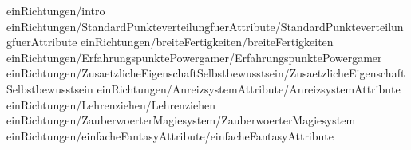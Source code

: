 
 {einRichtungen/intro}
 {einRichtungen/StandardPunkteverteilungfuerAttribute/StandardPunkteverteilungfuerAttribute} 
 {einRichtungen/breiteFertigkeiten/breiteFertigkeiten}
 {einRichtungen/ErfahrungspunktePowergamer/ErfahrungspunktePowergamer}
 {einRichtungen/ZusaetzlicheEigenschaftSelbstbewusstsein/ZusaetzlicheEigenschaftSelbstbewusstsein}
 {einRichtungen/AnreizsystemAttribute/AnreizsystemAttribute}
 {einRichtungen/Lehrenziehen/Lehrenziehen}
 {einRichtungen/ZauberwoerterMagiesystem/ZauberwoerterMagiesystem}
 {einRichtungen/einfacheFantasyAttribute/einfacheFantasyAttribute}
